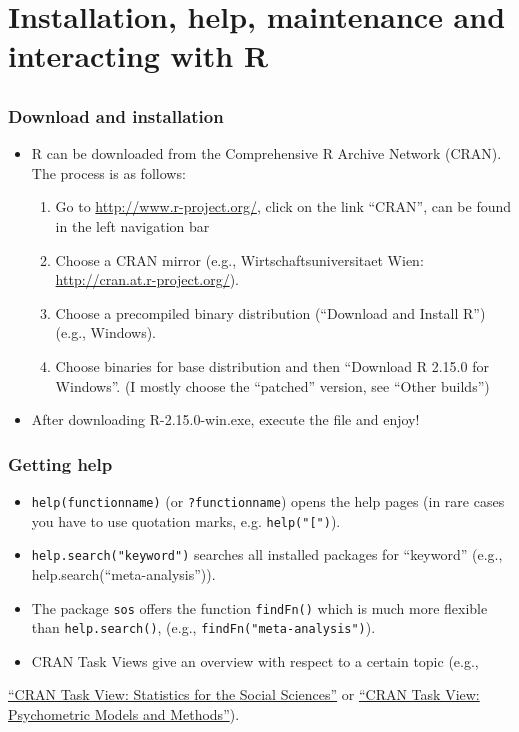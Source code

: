 \documentclass[bigger]{beamer}
\begin{document}
\section{Installation, help, maintenance and interacting with R}
\label{sec-2}
\subsection{}
\begin{frame}
\frametitle{Download and installation}
\label{sec-2-1-1}

\begin{itemize}
\item R can be downloaded from the Comprehensive R Archive Network (CRAN). The process is as follows:
\begin{enumerate}
\item Go to \href{http://www.r-project.org/}{http://www.r-project.org/}, click on the link \enquote{CRAN}, can be found
         in the left navigation bar
\item Choose a CRAN mirror (e.g., Wirtschaftsuniversitaet Wien: \href{http://cran.at.r-project.org/}{http://cran.at.r-project.org/}).
\item Choose a precompiled binary distribution (\enquote{Download and Install R}) (e.g., Windows).
\item Choose binaries for base distribution and then \enquote{Download R 2.15.0 for
         Windows}. (I mostly choose the \enquote{patched} version, see \enquote{Other builds})
\end{enumerate}
\item After downloading R-2.15.0-win.exe, execute the file and enjoy!
\end{itemize}
\end{frame}
\begin{frame}
\frametitle{Getting help}
\label{sec-2-1-2}

\begin{itemize}
\item \texttt{help(functionname)} (or \texttt{?functionname}) opens the help pages (in rare cases you have to use
      quotation marks, e.g. \texttt{help("[")}).
\item \texttt{help.search("keyword")} searches all installed packages for \enquote{keyword} (e.g., help.search(\enquote{meta-analysis})).
\item The package \texttt{sos} offers the function \texttt{findFn()} which is much more flexible than \texttt{help.search()},
     (e.g., \texttt{findFn("meta-analysis")}).
\item CRAN Task Views give an overview with respect to a certain topic (e.g.,
\end{itemize}
  \href{http://cran.r-project.org/web/views/SocialSciences.html}{    \enquote{CRAN Task View: Statistics for the Social Sciences}} or
  \href{http://cran.r-project.org/web/views/Psychometrics.html}{\enquote{CRAN Task View: Psychometric Models and Methods}}).   

\end{frame}
\end{document}
